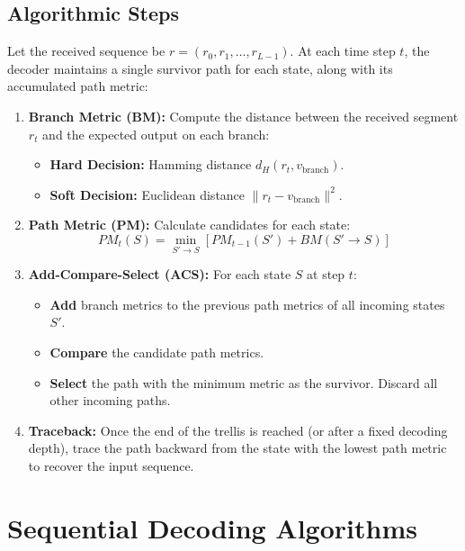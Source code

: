 \documentclass[12pt,a4paper]{article}
\begin{document}
\subsection{Algorithmic Steps}
Let the received sequence be $r = (r_0, r_1, \dots, r_{L-1})$. At each time step $t$, the decoder maintains a single survivor path for each state, along with its accumulated path metric:
\begin{enumerate}[leftmargin=*, itemsep=3.5pt]
  \item \textbf{Branch Metric (BM):} Compute the distance between the received segment $r_t$ and the expected output on each branch:
    \begin{itemize}[leftmargin=*, itemsep=2pt]
      \item \textbf{Hard Decision:} Hamming distance $d_H(r_t, v_{\text{branch}})$.
      \item \textbf{Soft Decision:} Euclidean distance $\|r_t - v_{\text{branch}}\|^2$.
    \end{itemize}
  \item \textbf{Path Metric (PM):} Calculate candidates for each state:
    \[ PM_t(S) = \min_{S' \to S} \left[ PM_{t-1}(S') + BM(S' \to S) \right] \]
  \item \textbf{Add-Compare-Select (ACS):} For each state $S$ at step $t$:
    \begin{itemize}[leftmargin=*, itemsep=2pt]
      \item \textbf{Add} branch metrics to the previous path metrics of all incoming states $S'$.
      \item \textbf{Compare} the candidate path metrics.
      \item \textbf{Select} the path with the minimum metric as the survivor. Discard all other incoming paths.
    \end{itemize}
  \item \textbf{Traceback:} Once the end of the trellis is reached (or after a fixed decoding depth), trace the path backward from the state with the lowest path metric to recover the input sequence.
\end{enumerate}

\section{Sequential Decoding Algorithms}
\end{document}

